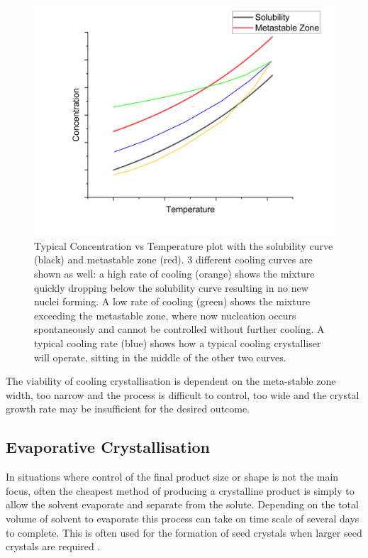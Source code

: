 \begin{figure}[h!]
	\includegraphics[width=\linewidth]{MSZW.png}
	\caption{Typical Concentration vs Temperature plot with the 
		solubility curve (black) and metastable zone (red). 3 
		different cooling curves are shown as well: a high rate 
		of cooling (orange) shows the mixture quickly dropping 
		below the solubility curve resulting in no new nuclei 
		forming. A low rate of cooling (green) shows the mixture 
		exceeding the metastable zone, where now nucleation occurs 
		spontaneously and cannot be controlled without further 
		cooling. A typical cooling rate (blue) shows how a 
		typical cooling crystalliser will operate, sitting in the 
		middle of the other two curves.}
	\label{fig:MSZW}
\end{figure}

The viability of cooling crystallisation is dependent on the 
meta-stable zone width, too narrow and the process is difficult to 
control, too wide and the crystal growth rate may be insufficient 
for the desired outcome.

\subsection{Evaporative Crystallisation}
In situations where control of the final product size or shape 
is not the main focus, often the cheapest method of producing a 
crystalline product is simply to allow the solvent evaporate and 
separate from the solute. Depending on the total volume of solvent 
to evaporate this process can take on time scale of several days 
to complete. This is often used for the formation of seed crystals 
when larger seed crystals are required \cite{Srinivasan2008, Li1992}.

